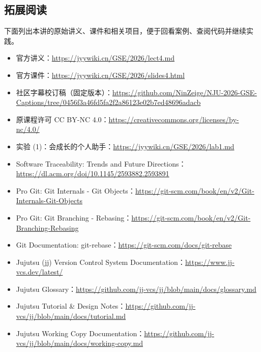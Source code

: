 \documentclass[UTF8,a4paper,11pt,fontset=fandol]{ctexart}
\begin{document}
\subsection{拓展阅读}

下面列出本讲的原始讲义、课件和相关项目，便于回看案例、查阅代码并继续实践。

\begin{itemize}

\item 官方讲义：\url{https://jyywiki.cn/GSE/2026/lect4.md}

\item 官方课件：\url{https://jyywiki.cn/GSE/2026/slides4.html}

\item 社区字幕校订稿（固定版本）：\url{https://github.com/NinZeige/NJU-2026-GSE-Captions/tree/0456f3a46fd5fa2f2a86123e02b7ed48696adacb}

\item 原课程许可 CC BY-NC 4.0：\url{https://creativecommons.org/licenses/by-nc/4.0/}

\item 实验 (1)：会成长的个人助手：\url{https://jyywiki.cn/GSE/2026/lab1.md}

\item Software Traceability: Trends and Future Directions：\url{https://dl.acm.org/doi/10.1145/2593882.2593891}

\item Pro Git: Git Internals - Git Objects：\url{https://git-scm.com/book/en/v2/Git-Internals-Git-Objects}

\item Pro Git: Git Branching - Rebasing：\url{https://git-scm.com/book/en/v2/Git-Branching-Rebasing}

\item Git Documentation: git-rebase：\url{https://git-scm.com/docs/git-rebase}

\item Jujutsu (jj) Version Control System Documentation：\url{https://www.jj-vcs.dev/latest/}

\item Jujutsu Glossary：\url{https://github.com/jj-vcs/jj/blob/main/docs/glossary.md}

\item Jujutsu Tutorial \& Design Notes：\url{https://github.com/jj-vcs/jj/blob/main/docs/tutorial.md}

\item Jujutsu Working Copy Documentation：\url{https://github.com/jj-vcs/jj/blob/main/docs/working-copy.md}


\end{itemize}
\end{document}

